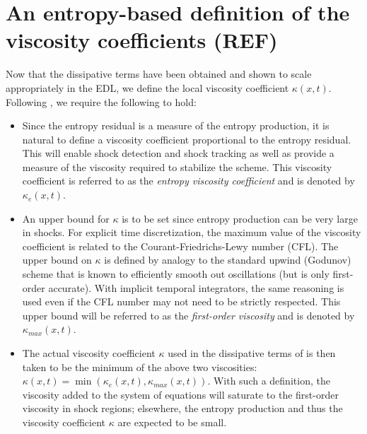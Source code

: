 \documentclass[review]{elsarticle}
\begin{document}
\section{An entropy-based definition of the viscosity coefficients (REF)}
%
Now that the dissipative terms have been obtained and shown to scale appropriately in the EDL, we define the local viscosity coefficient $\kappa(x,t)$. Following \cite{jlg1, jlg2}, we require the following to hold:
\begin{itemize}
\item Since the entropy residual is a measure of the entropy production, it is natural to define a viscosity coefficient proportional to the entropy residual. This will enable shock detection and shock tracking as well as provide a measure of the viscosity required to stabilize the scheme. This viscosity coefficient is referred to as the \emph{entropy viscosity coefficient} and is denoted by $\kappa_e(x,t)$.
\item An upper bound for $\kappa$ is to be set since entropy production can be very large in shocks. For explicit time discretization, the maximum value of the viscosity coefficient is related to the Courant-Friedrichs-Lewy number (CFL). The upper bound on  $\kappa$  is defined by analogy to the standard upwind (Godunov) scheme that is known to efficiently smooth out oscillations (but is only first-order accurate). With implicit temporal integrators, the same reasoning is used even if the CFL number may not need to be strictly respected. This upper bound will be referred to as the \emph{first-order viscosity} and is denoted by $\kappa_{max}(x,t)$.  
\item The actual viscosity coefficient $\kappa$ used in the dissipative terms of  is then taken to be the minimum of the above two viscosities:  $\kappa(x,t) = \min ( \kappa_e(x,t), \kappa_{max}(x,t) )$. With such a definition, the viscosity added to the system of equations will saturate to the first-order viscosity in shock regions; elsewhere, the entropy production and thus the viscosity coefficient $\kappa$ are expected to be small.
\end{itemize}
\end{document}

